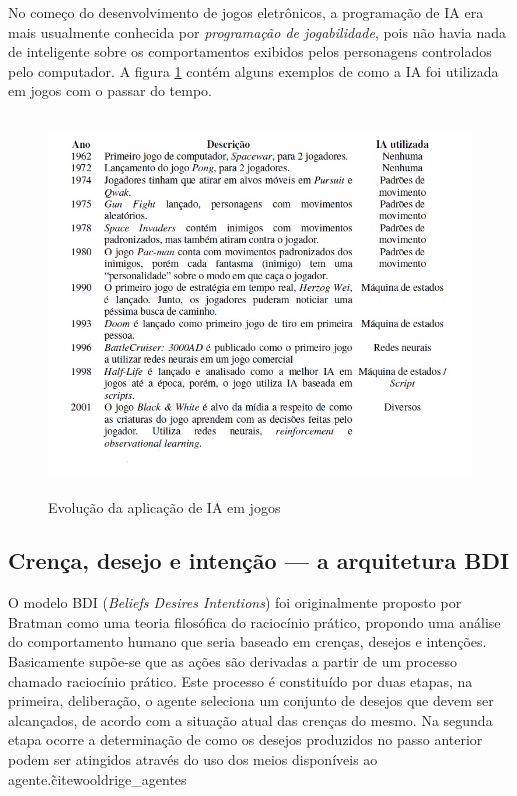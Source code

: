 No começo do desenvolvimento de jogos eletrônicos, a programação de IA era mais usualmente conhecida por \textit{programação de jogabilidade}, pois não havia nada de inteligente sobre os comportamentos exibidos pelos personagens controlados pelo computador. 
A figura \ref{IA em jogos} contém alguns exemplos de como a IA foi utilizada em jogos com o passar do tempo.

\begin{figure}
\centering
\includegraphics [height=10cm]{figuras/evolucao_IA_jogos.jpg}
\caption{Evolução da aplicação de IA em jogos~\cite{brian_schwab}}
\label{IA em jogos}
\end{figure}


\subsection{Crença, desejo e intenção --- a arquitetura BDI}

O modelo BDI (\textit{Beliefs Desires Intentions}) foi originalmente proposto por Bratman como uma teoria filosófica do raciocínio prático, propondo uma análise do comportamento humano que seria baseado em crenças, desejos e intenções.
Basicamente supõe-se que as ações são derivadas a partir de um processo chamado raciocínio prático. Este processo é constituído por duas etapas, na primeira, deliberação, o agente seleciona um conjunto de desejos que devem ser alcançados, de acordo com a situação atual das crenças do mesmo. Na segunda etapa ocorre a determinação de como os desejos produzidos no passo anterior podem ser atingidos através do uso dos meios disponíveis ao agente.\~cite{wooldrige_agentes}

